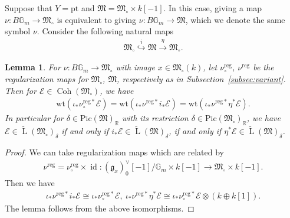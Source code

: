 \documentclass[11pt,oneside,a4paper,mathscr]{amsart}
\newtheorem{lemma}[thm]{Lemma}
\theoremstyle{definition}
\newcommand{\LL}{\operatorname{L}}
\newcommand{\cE}{\mathcal{E}}
\newcommand{\bgm}{B\mathbb{G}_m}
\newcommand{\Coh}{\operatorname{Coh}}
\newcommand{\id}{\operatorname{id}}
\newcommand{\wt}{\mathrm{wt}}
\begin{document}
Suppose that $Y=\mathrm{pt}$ and $\mathfrak{M}=\mathfrak{M}_{\circ}\times k[-1]$. In this case, giving a map $\nu\colon \bgm \to \mathfrak{M}_{\circ}$
is equivalent to giving $\nu \colon \bgm \to \mathfrak{M}$, which 
we denote the same symbol $\nu$. Consider the following natural 
maps 
\begin{align*}
    \mathfrak{M}_{\circ} \stackrel{i}{\hookrightarrow} 
    \mathfrak{M} \stackrel{\eta}{\to} \mathfrak{M}_{\circ}.
\end{align*}
\begin{lemma}\label{lem:eta}
For $\nu \colon \bgm \to \mathfrak{M}_{\circ}$ with image $x\in \mathfrak{M}_{\circ}(k)$, let $\nu_{\circ}^{\mathrm{reg}}$, 
$\nu^{\mathrm{reg}}$ be the regularization maps for $\mathfrak{M}_{\circ}$, 
$\mathfrak{M}$, respectively as in Subsection~\ref{subsec:variant}. Then 
for $\mathcal{E} \in \Coh(\mathfrak{M}_{\circ})$, we have 
\begin{align*}
    \wt(\iota_{*}\nu_{\circ}^{\mathrm{reg}*} \cE)=\wt(\iota_{*}\nu^{\mathrm{reg}*}i_{*}\cE)
    =\wt(\iota_{*}\nu^{\mathrm{reg}*}\eta^* \cE).
\end{align*}
In particular for $\delta \in \mathrm{Pic}(\mathfrak{M})_{\mathbb{R}}$
with its restriction $\delta\in \mathrm{Pic}(\mathfrak{M}_{\circ})_{\mathbb{R}}$, 
we have $\cE \in \widetilde{\LL}(\mathfrak{M}_{\circ})_{\delta}$ if and only 
if $i_{*}\cE \in \widetilde{\LL}(\mathfrak{M})_{\delta}$, if and only if 
$\eta^*\cE \in \widetilde{\LL}(\mathfrak{M})_{\delta}$.
\end{lemma}
\begin{proof}
    We can take regularization maps which are related by 
    \begin{align*}
        \nu^{\mathrm{reg}}=\nu_{\circ}^{\mathrm{reg}}\times \id \colon 
        (\mathfrak{g}_x)_{0}^{\vee}[-1]/\mathbb{G}_m \times k[-1] \to 
        \mathfrak{M}_{\circ}\times k[-1].
    \end{align*}
    Then we have 
    \begin{align*}
        \iota_{*}\nu^{\mathrm{reg}*}i_{*}\cE\cong\iota_{*}\nu_{\circ}^{\mathrm{reg}*} \cE, \ 
         \iota_{*}\nu^{\mathrm{reg}*}\eta^*\cE\cong\iota_{*}\nu_{\circ}^{\mathrm{reg}*} \cE
         \otimes (k\oplus k[1]).
    \end{align*}
    The lemma follows from the above isomorphisms. 
\end{proof}
\end{document}
